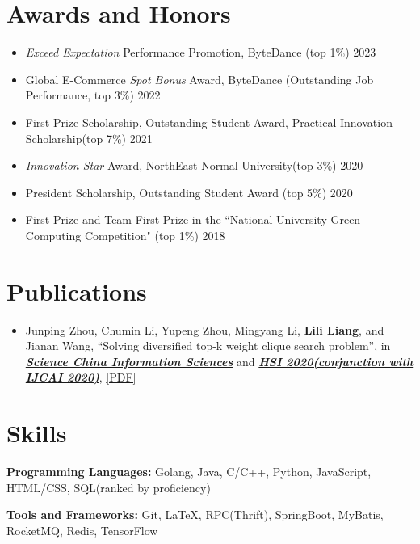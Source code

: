 \documentclass{resume}
\begin{document}
\section{Awards and Honors}
\begin{itemize}
    \item \textit{Exceed Expectation} Performance Promotion, ByteDance (top 1\%) \hfill 2023
    \item Global E-Commerce \textit{Spot Bonus} Award, ByteDance (Outstanding Job Performance, top 3\%) \hfill 2022
    \item First Prize Scholarship, Outstanding Student Award, Practical Innovation Scholarship(top 7\%) \hfill 2021
    \item \textit{Innovation Star} Award, NorthEast Normal University(top 3\%) \hfill 2020
    \item President Scholarship, Outstanding Student Award (top 5\%) \hfill 2020
    \item First Prize and Team First Prize in the ``National University Green Computing Competition" (top 1\%) \hfill 2018
\end{itemize}

\section{Publications} %
\begin{itemize}
    \item Junping Zhou, Chumin Li, Yupeng Zhou, Mingyang Li, \textbf{Lili Liang}, and Jianan Wang, 
    ``Solving diversified top-k weight clique search problem'', 
    in \textbf{\href{https://link.springer.com/article/10.1007/s11432-020-3069-4}{\textit{Science China Information Sciences}}} 
    and \textbf{\href{https://hsi-workshop.github.io/hsi2020-website/program.html}{\textit{HSI 2020(conjunction with IJCAI 2020)}}}, 
    \href{https://hsi-workshop.github.io/hsi2020-website/hsi2020/Solving%20diversified%20top-k%20weight%20clique%20search%20problem%20with%20MaxSAT.pdf}{[PDF]}
\end{itemize}

\section{Skills}
\textbf{Programming Languages:} Golang, Java, C/C++, Python, JavaScript, HTML/CSS, SQL(ranked by proficiency)

\textbf{Tools and Frameworks:} Git, \LaTeX, RPC(Thrift), SpringBoot, MyBatis, RocketMQ, Redis, TensorFlow
\end{document}
